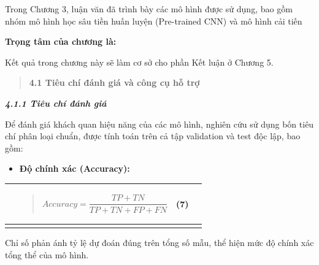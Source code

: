 \documentclass[
]{article}
\newcounter{none} %
\begin{document}
Trong Chương 3, luận văn đã trình bày các mô hình được sử dụng, bao gồm
nhóm mô hình học sâu tiền huấn luyện (Pre-trained CNN) và mô hình cải
tiến

\textbf{Trọng tâm của chương là:}

Kết quả trong chương này sẽ làm cơ sở cho phần Kết luận ở Chương 5.

\begin{quote}
\protect{}\label{_Toc232112035}{}\textbf{4.1 Tiêu chí đánh
giá và công cụ hỗ trợ}
\end{quote}

\protect{}\label{_Toc232112036}{}\emph{\textbf{4.1.1 Tiêu
chí đánh giá}}

Để đánh giá khách quan hiệu năng của các mô hình, nghiên cứu sử dụng bốn
tiêu chí phân loại chuẩn, được tính toán trên cả tập validation và test
độc lập, bao gồm:

\begin{itemize}
\item
  \textbf{Độ chính xác (Accuracy):}
\end{itemize}

{\def\LTcaptype{none} %
\begin{longtable}[]{@{}
  >{\raggedright\arraybackslash}p{}
  >{\raggedright\arraybackslash}p{}
  >{\raggedright\arraybackslash}p{}
  >{\raggedright\arraybackslash}p{}@{}}
\toprule\noalign{}
\begin{minipage}[b]{\linewidth}\raggedright
\end{minipage} & \begin{minipage}[b]{\linewidth}\raggedright
\begin{quote}
\[Accuracy = \frac{TP + TN}{TP + TN + FP + FN}\]
\end{quote}
\end{minipage} & \begin{minipage}[b]{\linewidth}\raggedright
(7)
\end{minipage} & \begin{minipage}[b]{\linewidth}\raggedright
\end{minipage} \\
\midrule\noalign{}
\endhead
\bottomrule\noalign{}
\endlastfoot
\end{longtable}
}

Chỉ số phản ánh tỷ lệ dự đoán đúng trên tổng số mẫu, thể hiện mức độ
chính xác tổng thể của mô hình.
\end{document}
